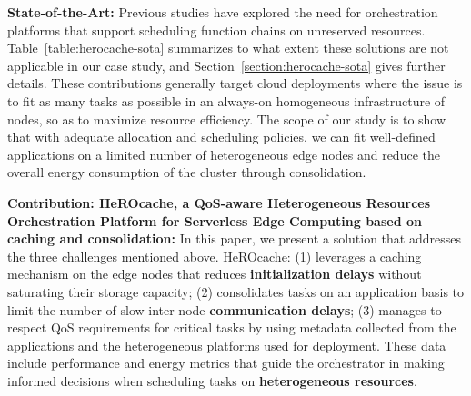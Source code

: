 \textbf{State-of-the-Art:} Previous studies have explored the need for orchestration platforms that support scheduling function chains on unreserved resources. Table~\ref{table:herocache-sota} summarizes to what extent these solutions are not applicable in our case study, and Section~\ref{section:herocache-sota} gives further details. These contributions generally target cloud deployments where the issue is to fit as many tasks as possible in an always-on homogeneous infrastructure of nodes, so as to maximize resource efficiency. The scope of our study is to show that with adequate allocation and scheduling policies, we can fit well-defined applications on a limited number of heterogeneous edge nodes and reduce the overall energy consumption of the cluster through consolidation.

\textbf{Contribution: HeROcache, a QoS-aware Heterogeneous Resources Orchestration Platform for Serverless Edge Computing based on caching and consolidation:} 
In this paper, we present a solution that addresses the three challenges mentioned above. HeROcache: (1) leverages a caching mechanism on the edge nodes that reduces \textbf{initialization delays} without saturating their storage capacity;
(2) consolidates tasks on an application basis to limit the number of slow inter-node \textbf{communication delays};
(3) manages to respect QoS requirements for critical tasks by using metadata collected from the applications and the heterogeneous platforms used for deployment. These data include performance and energy metrics that guide the orchestrator in making informed decisions when scheduling tasks on \textbf{heterogeneous resources}.





